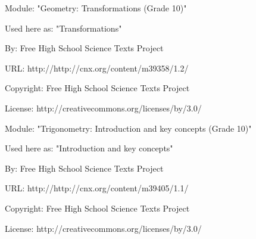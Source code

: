       \par\vspace{9pt}\noindent\begin{minipage}{\textwidth}
      Module: "Geometry: Transformations (Grade 10)" \par\nopagebreak\noindent
      Used here as: "Transformations" \par\nopagebreak\noindent
        By: Free High School Science Texts Project\par\nopagebreak\noindent
      URL: http://http://cnx.org/content/m39358/1.2/\par\nopagebreak\noindent
      \par\nopagebreak\noindent
      Copyright: Free High School Science Texts Project\par\nopagebreak\noindent
      License:  http://creativecommons.org/licenses/by/3.0/\par\nopagebreak\noindent
      \par\end{minipage}
      \par\vspace{9pt}\noindent\begin{minipage}{\textwidth}
      Module: "Trigonometry: Introduction and key concepts (Grade 10)" \par\nopagebreak\noindent
      Used here as: "Introduction and key concepts" \par\nopagebreak\noindent
        By: Free High School Science Texts Project\par\nopagebreak\noindent
      URL: http://http://cnx.org/content/m39405/1.1/\par\nopagebreak\noindent
      \par\nopagebreak\noindent
      Copyright: Free High School Science Texts Project\par\nopagebreak\noindent
      License:  http://creativecommons.org/licenses/by/3.0/\par\nopagebreak\noindent
      \par\end{minipage}
